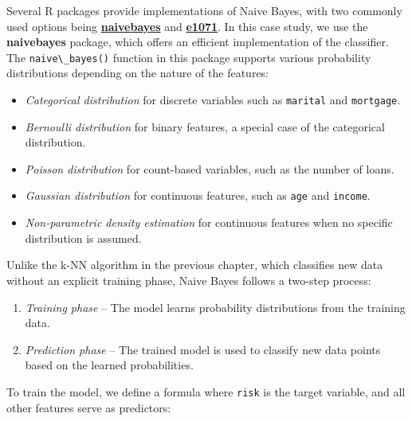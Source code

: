 \documentclass[
]{book}
\newcommand{\passthrough}[1]{#1}
\providecommand{\tightlist}{%
  \setlength{\itemsep}{0pt}\setlength{\parskip}{0pt}}
\theoremstyle{definition}
\theoremstyle{definition}
\theoremstyle{definition}
\theoremstyle{definition}
\theoremstyle{remark}
\begin{document}
Several R packages provide implementations of Naive Bayes, with two commonly used options being \href{https://CRAN.R-project.org/package=naivebayes}{\textbf{naivebayes}} and \href{https://CRAN.R-project.org/package=e1071}{\textbf{e1071}}. In this case study, we use the \textbf{naivebayes} package, which offers an efficient implementation of the classifier. The \passthrough{\lstinline!naive\_bayes()!} function in this package supports various probability distributions depending on the nature of the features:

\begin{itemize}
\tightlist
\item
  \emph{Categorical distribution} for discrete variables such as \passthrough{\lstinline!marital!} and \passthrough{\lstinline!mortgage!}.\\
\item
  \emph{Bernoulli distribution} for binary features, a special case of the categorical distribution.\\
\item
  \emph{Poisson distribution} for count-based variables, such as the number of loans.\\
\item
  \emph{Gaussian distribution} for continuous features, such as \passthrough{\lstinline!age!} and \passthrough{\lstinline!income!}.\\
\item
  \emph{Non-parametric density estimation} for continuous features when no specific distribution is assumed.
\end{itemize}

Unlike the k-NN algorithm in the previous chapter, which classifies new data without an explicit training phase, Naive Bayes follows a two-step process:

\begin{enumerate}
\def\labelenumi{\arabic{enumi}.}
\tightlist
\item
  \emph{Training phase} -- The model learns probability distributions from the training data.\\
\item
  \emph{Prediction phase} -- The trained model is used to classify new data points based on the learned probabilities.
\end{enumerate}

To train the model, we define a formula where \passthrough{\lstinline!risk!} is the target variable, and all other features serve as predictors:
\end{document}

